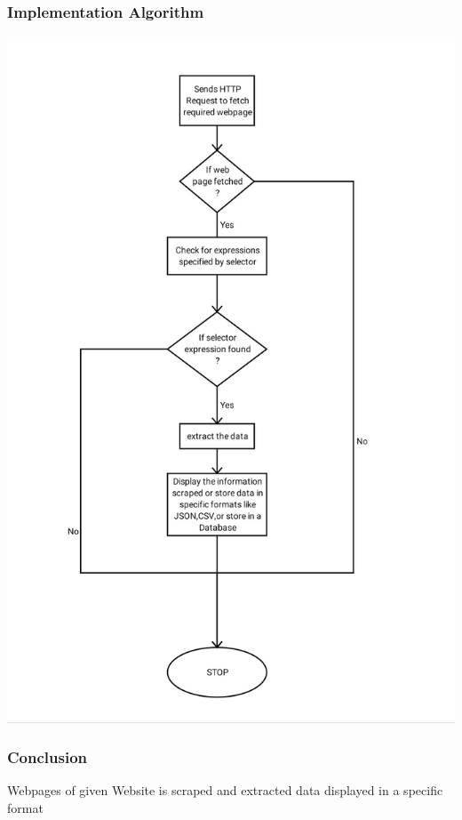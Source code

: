 \documentclass{beamer}
\begin{document}
\begin{frame}
\frametitle{Implementation Algorithm}
\center\includegraphics[scale=.12]{IMG_20191017_083215.jpg} 
\end{frame}

\begin{frame}
\frametitle{Conclusion}

Webpages of given Website is scraped and extracted data displayed in a specific format
\end{frame}
\end{document}
